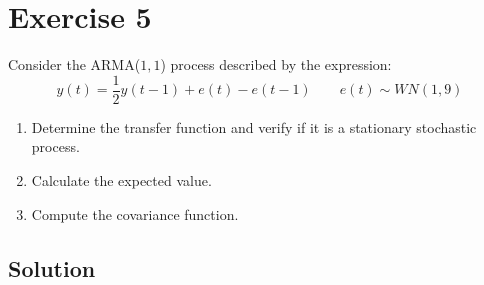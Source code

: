 \section{Exercise 5}

Consider the ARMA($1,1$) process described by the expression:
\[y(t)=\dfrac{1}{2}y(t-1)+e(t)-e(t-1) \qquad e(t)\sim WN(1,9)\]
\begin{enumerate}
    \item Determine the transfer function and verify if it is a stationary stochastic process.
    \item Calculate the expected value.
    \item Compute the covariance function.
\end{enumerate}

\subsection*{Solution}
